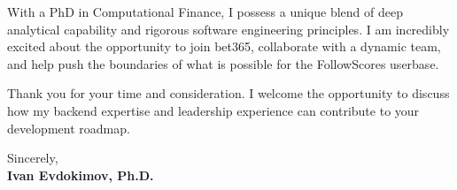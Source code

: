 \documentclass[11pt,a4paper]{article}
\begin{document}
With a PhD in Computational Finance, I possess a unique blend of deep analytical capability and rigorous software engineering principles. I am incredibly excited about the opportunity to join bet365, collaborate with a dynamic team, and help push the boundaries of what is possible for the FollowScores userbase.

Thank you for your time and consideration. I welcome the opportunity to discuss how my backend expertise and leadership experience can contribute to your development roadmap.

\vspace{1.5em}
Sincerely, \\
\vspace{0.5em}
\textbf{Ivan Evdokimov, Ph.D.}
\end{document}
